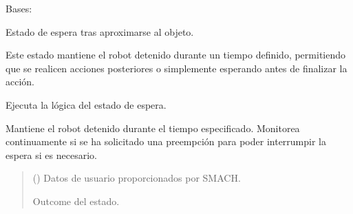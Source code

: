 \documentclass[a4paper,10pt,spanish]{sphinxmanual}
\begin{document}

\begin{fulllineitems}
\label{\detokenize{squad_approach_control_action:squad_approach_control_action.WaitState}}
\pysigstartsignatures
{}
\pysigstopsignatures
\sphinxAtStartPar
Bases: 

\sphinxAtStartPar
Estado de espera tras aproximarse al objeto.

\sphinxAtStartPar
Este estado mantiene el robot detenido durante un tiempo definido, permitiendo que
se realicen acciones posteriores o simplemente esperando antes de finalizar la acción.

\begin{fulllineitems}
\label{\detokenize{squad_approach_control_action:squad_approach_control_action.WaitState.execute}}
\pysigstartsignatures
{}
\pysigstopsignatures
\sphinxAtStartPar
Ejecuta la lógica del estado de espera.

\sphinxAtStartPar
Mantiene el robot detenido durante el tiempo especificado. Monitorea continuamente
si se ha solicitado una preempción para poder interrumpir la espera si es necesario.
\begin{quote}\begin{description}
\sphinxAtStartPar
{} () \textendash{} Datos de usuario proporcionados por SMACH.

\sphinxAtStartPar
Outcome del estado.

\sphinxAtStartPar
{}

\end{description}\end{quote}

\end{fulllineitems}


\end{fulllineitems}
\end{document}
